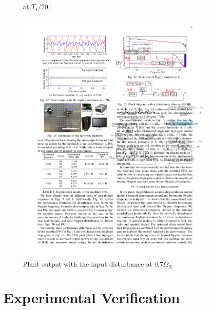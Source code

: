 \documentclass [11pt, proquest] {uwthesis}[2020/02/24]
\begin{document}
\begin{figure}[!ht]
\begin{centering}
at $T_{s}/20$.]{\begin{centering}
\includegraphics[width=10cm]{Spectral-analysis/FIG12b.pdf}
\par\end{centering}
}
\par\end{centering}
\caption{\label{fig:Plant-output-for-1}Plant output with the input disturbance
at $0.7\Omega_{N}$}
\end{figure}

\section{Experimental Verification\label{sec:Experimental-Verification}}
\end{document}

